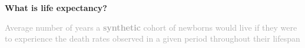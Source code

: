 \documentclass[xcolor={dvipsnames}]{beamer}
\begin{document}
\begin{frame}
\begin{columns}
\begin{column}{0.71\textwidth}
	\end{column}
	
	\begin{column}{0.25\textwidth}
	

	\end{column}
	
\end{columns}

\end{frame}



\begin{frame}
	\begin{center}
		\LARGE{\textbf{What is life expectancy?}} \pause \linebreak
	
\Large{\textcolor{darkgray}{Average number of years a \textbf{synthetic} cohort of newborns would live if they were to experience the death rates observed in a given period throughout their lifespan}} 

	\end{center}
			
\end{frame}
\end{document}
